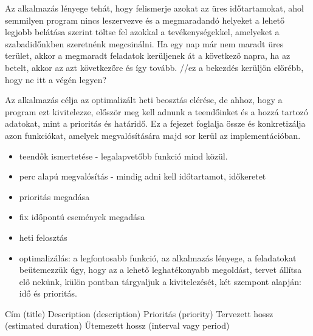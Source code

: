 Az alkalmazás lényege tehát, hogy felismerje azokat az üres időtartamokat, ahol semmilyen program nincs leszervezve és a megmaradandó helyeket a lehető legjobb belátása szerint töltse fel azokkal a tevékenységekkel, amelyeket a szabadidőnkben szeretnénk megcsinálni. Ha egy nap már nem maradt üres terület, akkor a megmaradt feladatok kerüljenek át a következő napra, ha az betelt, akkor az azt következőre és így tovább. //ez a bekezdés kerüljön előrébb, hogy ne itt a végén legyen?






Az alkalmazás célja az optimalizált heti beosztás elérése, de ahhoz, hogy a program ezt kivitelezze, először meg kell adnunk a teendőinket és a hozzá tartozó adatokat, mint a prioritás és határidő. Ez a fejezet foglalja össze és konkretizálja azon funkciókat, amelyek megvalósítására majd sor kerül az implementációban.

\begin{itemize}
\item teendők ismertetése - legalapvetőbb funkció mind közül.
\item perc alapú megvalósítás - mindig adni kell időtartamot, időkeretet
\item prioritás megadása
\item fix időpontú események megadása
\item heti felosztás
\item optimalizálás: a legfontosabb funkció, az alkalmazás lényege, a feladatokat beütemezzük úgy, hogy az a lehető leghatékonyabb megoldást, tervet állítsa elő nekünk, külön pontban tárgyaljuk a kivitelezését, két szempont alapján: idő és prioritás.
\end{itemize}




Cím (title)
Description (description)
Prioritás (priority)
Tervezett hossz (estimated duration)
Ütemezett hossz (interval vagy period)

